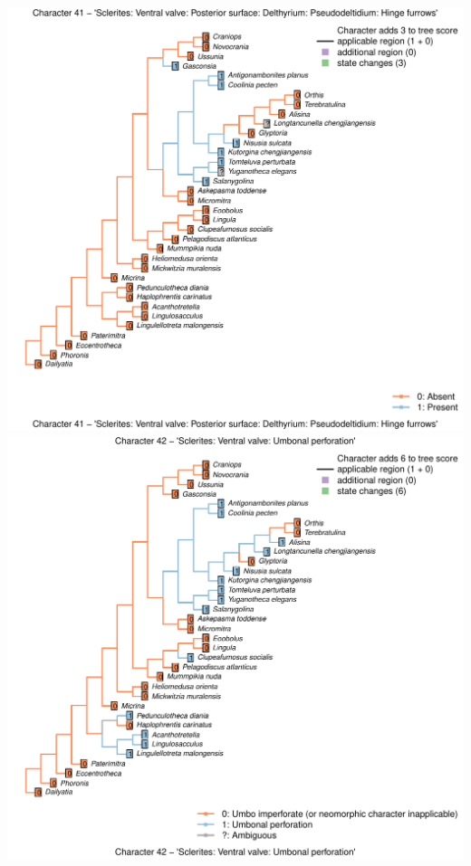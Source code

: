 \documentclass[]{book}
\theoremstyle{definition}
\theoremstyle{definition}
\theoremstyle{definition}
\theoremstyle{remark}
\begin{document}
\includegraphics{Brachiopod_phylogeny_files/figure-latex/unnamed-chunk-4-41.pdf}
\includegraphics{Brachiopod_phylogeny_files/figure-latex/unnamed-chunk-4-42.pdf}
\end{document}
